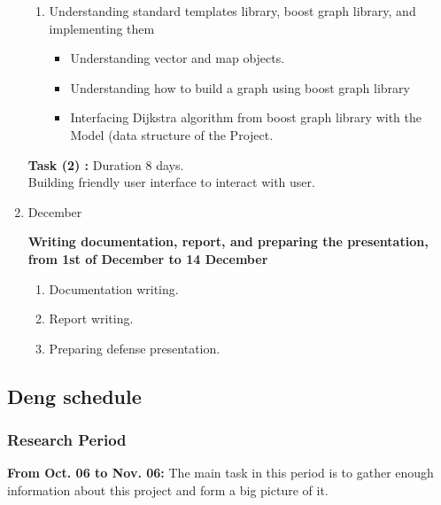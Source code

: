 \documentclass[a4paper, 12pt, english]{book}
\begin{document}
\begin{enumerate}
\begin{enumerate}
\item {Understanding standard templates library, boost graph library, and implementing them}
\begin{itemize}
    \item {Understanding vector and map objects.}
    \item {Understanding how to build a graph using boost graph library}
    \item {Interfacing Dijkstra algorithm from boost graph library  with the Model (data structure of the Project.\\} 
\end{itemize}
\end{enumerate}
\textbf{Task (2) :} Duration 8 days.\\
Building friendly user interface to interact with user.

\item {{\Large December\par}}
\textbf{Writing documentation, report, and preparing the presentation, from 1st of December to 14 December}
\begin{enumerate}

\item {Documentation writing.}
\item {Report writing.}
\item {Preparing defense presentation.}

\end{enumerate}

\end{enumerate}
\subsection{Deng schedule}

\subsubsection{Research Period}

	{\textbf{From Oct. 06 to Nov. 06:}} The main task in this period is to gather enough information about this project and form a big picture of it. 
\end{document}
